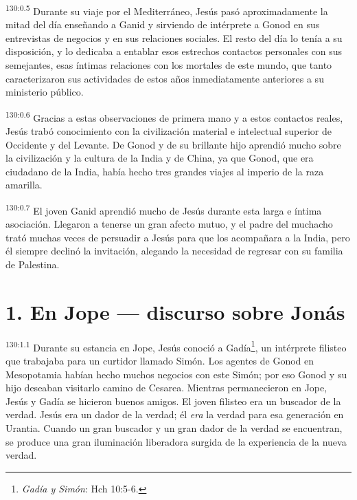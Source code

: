 \par
\textsuperscript{130:0.5} Durante su viaje por el Mediterráneo, Jesús pasó aproximadamente la mitad del día enseñando a Ganid y sirviendo de intérprete a Gonod en sus entrevistas de negocios y en sus relaciones sociales. El resto del día lo tenía a su disposición, y lo dedicaba a entablar esos estrechos contactos personales con sus semejantes, esas íntimas relaciones con los mortales de este mundo, que tanto caracterizaron sus actividades de estos años inmediatamente anteriores a su ministerio público.

\par
\textsuperscript{130:0.6} Gracias a estas observaciones de primera mano y a estos contactos reales, Jesús trabó conocimiento con la civilización material e intelectual superior de Occidente y del Levante. De Gonod y de su brillante hijo aprendió mucho sobre la civilización y la cultura de la India y de China, ya que Gonod, que era ciudadano de la India, había hecho tres grandes viajes al imperio de la raza amarilla.

\par
\textsuperscript{130:0.7} El joven Ganid aprendió mucho de Jesús durante esta larga e íntima asociación. Llegaron a tenerse un gran afecto mutuo, y el padre del muchacho trató muchas veces de persuadir a Jesús para que los acompañara a la India, pero él siempre declinó la invitación, alegando la necesidad de regresar con su familia de Palestina.

\section*{1. En Jope --- discurso sobre Jonás}
\par
\textsuperscript{130:1.1} Durante su estancia en Jope, Jesús conoció a Gadía\footnote{\textit{Gadía y Simón}: Hch 10:5-6.}, un intérprete filisteo que trabajaba para un curtidor llamado Simón. Los agentes de Gonod en Mesopotamia habían hecho muchos negocios con este Simón; por eso Gonod y su hijo deseaban visitarlo camino de Cesarea. Mientras permanecieron en Jope, Jesús y Gadía se hicieron buenos amigos. El joven filisteo era un buscador de la verdad. Jesús era un dador de la verdad; él \textit{era} la verdad para esa generación en Urantia. Cuando un gran buscador y un gran dador de la verdad se encuentran, se produce una gran iluminación liberadora surgida de la experiencia de la nueva verdad.

